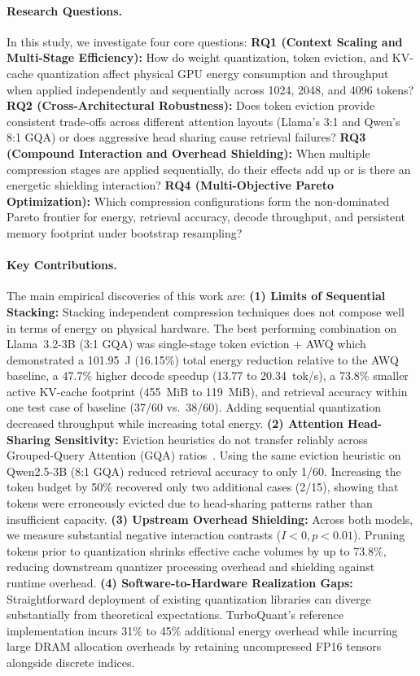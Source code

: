 \documentclass[sigconf,nonacm]{acmart}
\begin{document}
\paragraph{Research Questions.}
In this study, we investigate four core questions:
\textbf{RQ1 (Context Scaling and Multi-Stage Efficiency):} How do weight quantization, token eviction, and KV-cache quantization affect physical GPU energy consumption and throughput when applied independently and sequentially across 1024, 2048, and 4096 tokens?
\textbf{RQ2 (Cross-Architectural Robustness):} Does token eviction provide consistent trade-offs across different attention layouts (Llama's 3:1 and Qwen's 8:1 GQA) or does aggressive head sharing cause retrieval failures?
\textbf{RQ3 (Compound Interaction and Overhead Shielding):} When multiple compression stages are applied sequentially, do their effects add up or is there an energetic shielding interaction?
\textbf{RQ4 (Multi-Objective Pareto Optimization):} Which compression configurations form the non-dominated Pareto frontier for energy, retrieval accuracy, decode throughput, and persistent memory footprint under bootstrap resampling?

\paragraph{Key Contributions.}
The main empirical discoveries of this work are:
\textbf{(1) Limits of Sequential Stacking:} Stacking independent compression techniques does not compose well in terms of energy on physical hardware. The best performing combination on Llama~3.2-3B (3:1 GQA) was single-stage token eviction + AWQ which demonstrated a 101.95~J (16.15\%) total energy reduction relative to the AWQ baseline, a 47.7\% higher decode speedup (13.77 to 20.34~tok/s), a 73.8\% smaller active KV-cache footprint (455~MiB to 119~MiB), and retrieval accuracy within one test case of baseline (37/60 vs.\ 38/60). Adding sequential quantization decreased throughput while increasing total energy.
\textbf{(2) Attention Head-Sharing Sensitivity:} Eviction heuristics do not transfer reliably across Grouped-Query Attention (GQA) ratios~\cite{ainslie2023gqa}. Using the same eviction heuristic on Qwen2.5-3B (8:1 GQA) reduced retrieval accuracy to only 1/60. Increasing the token budget by 50\% recovered only two additional cases (2/15), showing that tokens were erroneously evicted due to head-sharing patterns rather than insufficient capacity.
\textbf{(3) Upstream Overhead Shielding:} Across both models, we measure substantial negative interaction contrasts ($I < 0, p < 0.01$). Pruning tokens prior to quantization shrinks effective cache volumes by up to 73.8\%, reducing downstream quantizer processing overhead and shielding against runtime overhead.
\textbf{(4) Software-to-Hardware Realization Gaps:} Straightforward deployment of existing quantization libraries can diverge substantially from theoretical expectations. TurboQuant's reference implementation incurs 31\% to 45\% additional energy overhead while incurring large DRAM allocation overheads by retaining uncompressed FP16 tensors alongside discrete indices.
\end{document}
